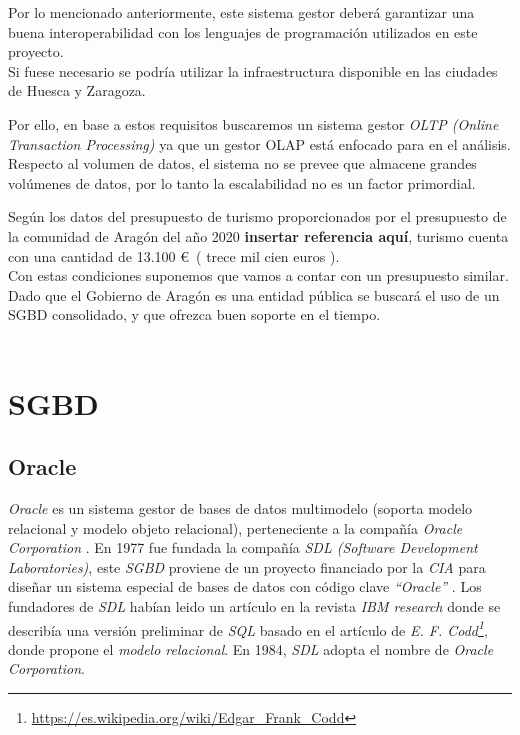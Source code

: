 \documentclass[3pt]{article}
\begin{document}
Por lo mencionado anteriormente, este sistema gestor deberá garantizar una buena interoperabilidad con los lenguajes de programación utilizados en este proyecto. \\

Si fuese necesario se podría utilizar la infraestructura disponible en las ciudades de Huesca y Zaragoza.

Por ello, en base a estos requisitos buscaremos un sistema gestor \textit{OLTP (Online Transaction Processing)} ya que un gestor OLAP está enfocado para en el análisis. Respecto al volumen de datos, el sistema no se prevee que almacene grandes volúmenes de datos, por lo tanto la escalabilidad no es un factor primordial.

Según los datos del presupuesto de turismo proporcionados por el presupuesto de la comunidad de Aragón del año 2020 \textbf{insertar referencia aquí}, turismo cuenta con una cantidad de 13.100 \euro \ ( trece mil cien euros ).\cite{ARAG:1}\\
Con estas condiciones suponemos que vamos a contar con un presupuesto similar.\\

Dado que el Gobierno de Aragón es una entidad pública se buscará el uso de un SGBD consolidado, y que ofrezca buen soporte en el tiempo. \\\\

\section{SGBD}

\subsection{Oracle}

\emph{Oracle} es un sistema gestor de bases de datos multimodelo (soporta modelo relacional y modelo objeto relacional), perteneciente a la compañía \emph{Oracle Corporation} \cite{WIKI:1} . En 1977 fue fundada la compañía \emph{SDL (Software Development Laboratories)}, este \emph{SGBD} proviene de un proyecto financiado por la \emph{CIA} para diseñar un sistema especial de bases de datos con código clave \emph{``Oracle''} \cite{WIKI:2}. Los fundadores de \emph{SDL} habían leido un artículo en la revista \emph{IBM research} donde se describía una versión preliminar de \emph{SQL} basado en el artículo de \emph{E. F. Codd\footnote{\url{https://es.wikipedia.org/wiki/Edgar_Frank_Codd}}}, donde propone el \emph{modelo relacional}. En 1984, \emph{SDL} adopta el nombre de \emph{Oracle Corporation}.\\
\end{document}
